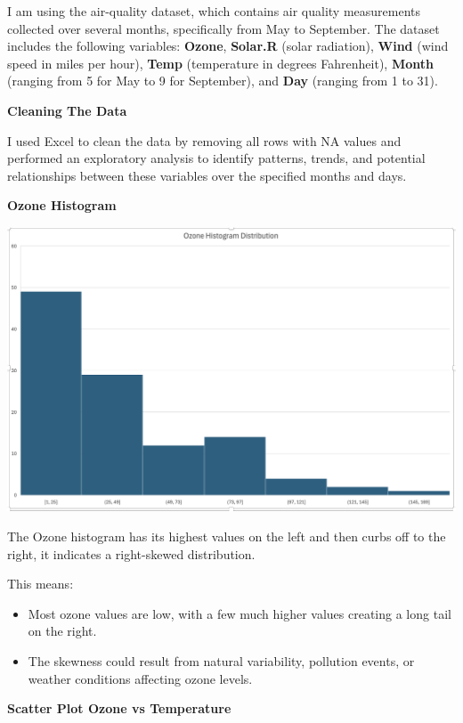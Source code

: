 \documentclass[
  letterpaper,
  DIV=11,
  numbers=noendperiod]{scrreprt}
\providecommand{\tightlist}{%
  \setlength{\itemsep}{0pt}\setlength{\parskip}{0pt}}\usepackage{longtable,booktabs,array}
\begin{document}
I am using the air-quality dataset, which contains air quality
measurements collected over several months, specifically from May to
September. The dataset includes the following variables: \textbf{Ozone},
\textbf{Solar.R} (solar radiation), \textbf{Wind} (wind speed in miles
per hour), \textbf{Temp} (temperature in degrees Fahrenheit),
\textbf{Month} (ranging from 5 for May to 9 for September), and
\textbf{Day} (ranging from 1 to 31).

\textbf{Cleaning The Data}

I used Excel to clean the data by removing all rows with NA values and
performed an exploratory analysis to identify patterns, trends, and
potential relationships between these variables over the specified
months and days.

\textbf{Ozone Histogram}

\includegraphics{hist_ozone_baruga.png}

The Ozone histogram has its highest values on the left and then curbs
off to the right, it indicates a right-skewed distribution.

This means:

\begin{itemize}
\tightlist
\item
  Most ozone values are low, with a few much higher values creating a
  long tail on the right.
\item
  The skewness could result from natural variability, pollution events,
  or weather conditions affecting ozone levels.
\end{itemize}

\textbf{Scatter Plot Ozone vs Temperature}
\end{document}
